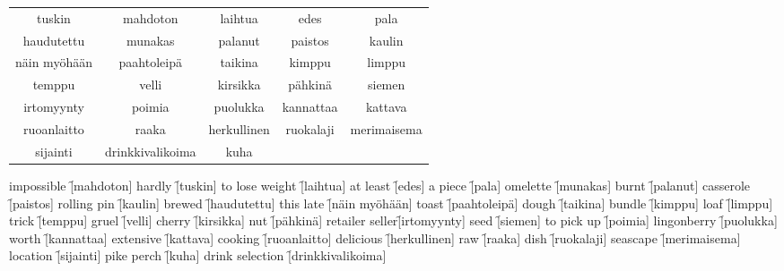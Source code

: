 \begin{center}
  \begin{tabular}{|c c c c c|}
    \hline
    tuskin & mahdoton & laihtua & edes & pala \\
    haudutettu & munakas & palanut & paistos & kaulin \\
    näin myöhään & paahtoleipä & taikina & kimppu & limppu \\
    temppu & velli & kirsikka & pähkinä & siemen \\
    irtomyynty & poimia & puolukka & kannattaa & kattava \\
    ruoanlaitto & raaka & herkullinen & ruokalaji & merimaisema \\
    sijainti & drinkkivalikoima & kuha && \\
    \hline
  \end{tabular}
\end{center}

\begin{questions}
  \begin{multicols}{3}
    \raggedcolumns
    \question impossible     \f[mahdoton]
    \question hardly         \f[tuskin]
    \question to lose weight \f[laihtua]
    \question at least       \f[edes]
    \question a piece        \f[pala]
    \question omelette       \f[munakas]
    \question burnt          \f[palanut]
    \question casserole      \f[paistos]
    \question rolling pin    \f[kaulin]
    \question brewed         \f[haudutettu]
    \question this late      \f[näin myöhään]
    \question toast          \f[paahtoleipä]
    \question dough          \f[taikina]
    \question bundle         \f[kimppu]
    \question loaf           \f[limppu]
    \question trick          \f[temppu]
    \question gruel          \f[velli]
    \question cherry         \f[kirsikka]
    \question nut            \f[pähkinä]
    \question retailer seller\f[irtomyynty]
    \question seed           \f[siemen]
    \question to pick up     \f[poimia]
    \question lingonberry       \f[puolukka]
    \question worth             \f[kannattaa]
    \question extensive         \f[kattava]
    \question cooking           \f[ruoanlaitto]
    \question delicious         \f[herkullinen]
    \question raw               \f[raaka]
    \question dish              \f[ruokalaji]
    \question seascape          \f[merimaisema]
    \question location          \f[sijainti]
    \question pike perch        \f[kuha]
    \question drink selection   \f[drinkkivalikoima]
  \end{multicols}
\end{questions}
